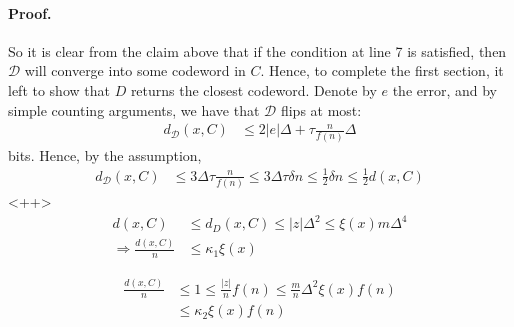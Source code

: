 \documentclass{article}
\begin{document}
\begin{multicols*}{2}
\paragraph{Proof.} So it is clear from the claim above that if the condition at line 7 is satisfied, then $\mathcal{D}$  will converge into some codeword in $C$. Hence, to complete the first section, it left to show that $D$ returns the closest codeword. Denote by $e$ the error, and by simple counting arguments, we have that $\mathcal{D}$ flips at most:  
\begin{equation*}
  \begin{split}
    d_{\mathcal{D}}\left( x, C \right) & \le 2|e|\Delta + \tau \frac{n}{f\left( n \right)}\Delta
  \end{split}
\end{equation*}
bits. Hence, by the assumption, 
\begin{equation*}
  \begin{split}
    d_{\mathcal{D}}\left( x, C \right) & \le 3\Delta \tau \frac{n}{f\left( n \right)} \le 3\Delta \tau\delta n \le \frac{1}{2} \delta n \le \frac{1}{2} d\left( x, C \right) 
  \end{split}
\end{equation*}<++>
\begin{equation*}
  \begin{split}
    d\left( x, C \right) & \le d_{D} \left( x, C \right) \le |z|\Delta^2 \le \xi\left( x \right) m \Delta^{4} \\ 
    \Rightarrow  \frac{d\left( x, C \right)}{n} &\le \kappa_{1} \xi\left( x \right)    
  \end{split}
\end{equation*}


\begin{equation*}
  \begin{split}
    \frac{d\left( x, C \right)}{n} & \le 1 \le \frac{|z|}{n}f\left( n \right) \le \frac{m}{n} \Delta^{2} \xi\left( x\right)f\left( n \right) \\ & \le \kappa_{2} \xi\left( x \right)f\left( n \right)  
  \end{split}
\end{equation*}

  \printbibliography 
\end{multicols*}
\end{document}
